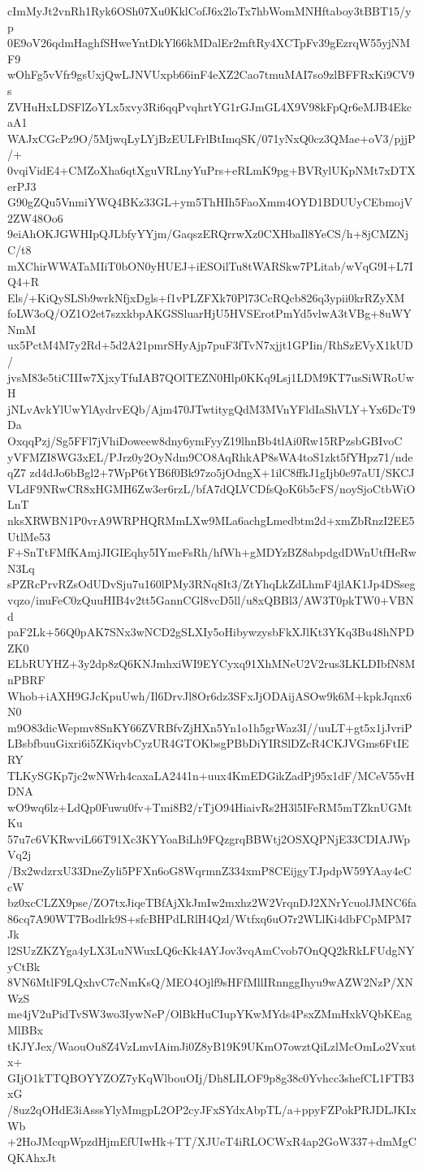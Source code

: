 cImMyJt2vnRh1Ryk6OSh07Xu0KklCofJ6x2loTx7hbWomMNHftaboy3tBBT15/yp
0E9oV26qdmHaghfSHweYntDkYl66kMDalEr2mftRy4XCTpFv39gEzrqW55yjNMF9
wOhFg5vVfr9gsUxjQwLJNVUxpb66inF4eXZ2Cao7tmuMAI7so9zlBFFRxKi9CV9s
ZVHuHxLDSFlZoYLx5xvy3Ri6qqPvqhrtYG1rGJmGL4X9V98kFpQr6eMJB4EkcaA1
WAJxCGcPz9O/5MjwqLyLYjBzEULFrlBtImqSK/071yNxQ0cz3QMae+oV3/pjjP/+
0vqiVidE4+CMZoXha6qtXguVRLnyYuPrs+eRLmK9pg+BVRylUKpNMt7xDTXerPJ3
G90gZQu5VnmiYWQ4BKz33GL+ym5ThHIh5FaoXmm4OYD1BDUUyCEbmojV2ZW48Oo6
9eiAhOKJGWHIpQJLbfyYYjm/GaqszERQrrwXz0CXHbaIl8YeCS/h+8jCMZNjC/t8
mXChirWWATaMIiT0bON0yHUEJ+iESOilTu8tWARSkw7PLitab/wVqG9I+L7IQ4+R
Els/+KiQySLSb9wrkNfjxDgls+f1vPLZFXk70Pl73CcRQcb826q3ypii0krRZyXM
foLW3oQ/OZ1O2et7szxkbpAKGSSluarHjU5HVSErotPmYd5vlwA3tVBg+8uWYNmM
ux5PctM4M7y2Rd+5d2A21pmrSHyAjp7puF3fTvN7xjjt1GPIin/RhSzEVyX1kUD/
jvsM83e5tiCIIIw7XjxyTfuIAB7QOlTEZN0Hlp0KKq9Lsj1LDM9KT7usSiWRoUwH
jNLvAvkYlUwYlAydrvEQb/Ajm470JTwtitygQdM3MVnYFldIaShVLY+Yx6DcT9Da
OxqqPzj/Sg5FFl7jVhiDoweew8dny6ymFyyZ19lhnBb4tlAi0Rw15RPzsbGBIvoC
yVFMZI8WG3xEL/PJrz0y2OyNdm9CO8AqRhkAP8sWA4toS1zkt5fYHpz71/ndeqZ7
zd4dJo6bBgl2+7WpP6tYB6f0Bk97zo5jOdngX+1ilC8ffkJ1gIjb0e97aUI/SKCJ
VLdF9NRwCR8xHGMH6Zw3er6rzL/bfA7dQLVCDfsQoK6b5cFS/noySjoCtbWiOLnT
nksXRWBN1P0vrA9WRPHQRMmLXw9MLa6achgLmedbtm2d+xmZbRnzI2EE5UtlMe53
F+SnTtFMfKAmjJIGIEqhy5IYmeFsRh/hfWh+gMDYzBZ8abpdgdDWnUtfHeRwN3Lq
sPZRcPrvRZsOdUDvSju7u160lPMy3RNq8It3/ZtYhqLkZdLhmF4jlAK1Jp4DSseg
vqzo/inuFeC0zQuuHIB4v2tt5GannCGl8vcD5ll/u8xQBBl3/AW3T0pkTW0+VBNd
paF2Lk+56Q0pAK7SNx3wNCD2gSLXIy5oHibywzysbFkXJlKt3YKq3Bu48hNPDZK0
ELbRUYHZ+3y2dp8zQ6KNJmhxiWI9EYCyxq91XhMNeU2V2rus3LKLDIbfN8MnPBRF
Whob+iAXH9GJcKpuUwh/Il6DrvJl8Or6dz3SFxJjODAijASOw9k6M+kpkJqnx6N0
m9O83dicWepmv8SnKY66ZVRBfvZjHXn5Yn1o1h5grWaz3I//uuLT+gt5x1jJvriP
LBsbfbuuGixri6i5ZKiqvbCyzUR4GTOKbsgPBbDiYIRSlDZcR4CKJVGms6FtIERY
TLKySGKp7jc2wNWrh4caxaLA2441n+uux4KmEDGikZadPj95x1dF/MCeV55vHDNA
wO9wq6lz+LdQp0Fuwu0fv+Tmi8B2/rTjO94HiaivRs2H3l5IFeRM5mTZknUGMtKu
57u7c6VKRwviL66T91Xc3KYYoaBiLh9FQzgrqBBWtj2OSXQPNjE33CDIAJWpVq2j
/Bx2wdzrxU33DneZyli5PFXn6oG8WqrmnZ334xmP8CEijgyTJpdpW59YAay4eCcW
bz0xcCLZX9pse/ZO7txJiqeTBfAjXkJmIw2mxhz2W2VrqnDJ2XNrYcuolJMNC6fa
86cq7A90WT7Bodlrk9S+sfcBHPdLRlH4Qzl/Wtfxq6uO7r2WLlKi4dbFCpMPM7Jk
l2SUzZKZYga4yLX3LuNWuxLQ6cKk4AYJov3vqAmCvob7OnQQ2kRkLFUdgNYyCtBk
8VN6MtlF9LQxhvC7cNmKsQ/MEO4Ojlf9sHFfMllIRnnggIhyu9wAZW2NzP/XNWzS
me4jV2uPidTvSW3wo3IywNeP/OlBkHuCIupYKwMYds4PsxZMmHxkVQbKEagMlBBx
tKJYJex/WaouOu8Z4VzLmvIAimJi0Z8yB19K9UKmO7owztQiLzlMcOmLo2Vxutx+
GIjO1kTTQBOYYZOZ7yKqWlbouOIj/Dh8LILOF9p8g38c0Yvhcc3shefCL1FTB3xG
/8uz2qOHdE3iAsssYlyMmgpL2OP2cyJFxSYdxAbpTL/a+ppyFZPokPRJDLJKIxWb
+2HoJMcqpWpzdHjmEfUIwHk+TT/XJUeT4iRLOCWxR4ap2GoW337+dmMgCQKAhxJt
